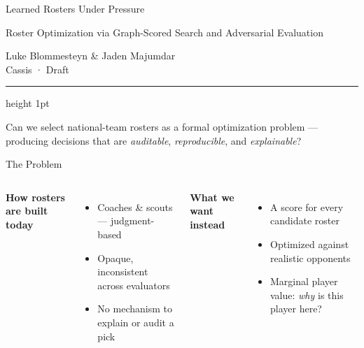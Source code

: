 \documentclass[aspectratio=169,11pt]{beamer}
\begin{document}
\begin{frame}
\vspace{1.8em}
{
Learned Rosters Under Pressure\par}
\vspace{0.3em}
{\color{steel}\small Roster Optimization via Graph-Scored Search and Adversarial Evaluation\par}
\vspace{1.1em}
{\small Luke Blommesteyn \quad \& \quad Jaden Majumdar}\\[0.15em]
{\color{steel}\scriptsize Cassis · Draft}
\vspace{1.3em}
{\color{navy}\hrule height 1pt}
\vspace{0.6em}
{\small Can we select national-team rosters as a formal optimization problem —
producing decisions that are \textit{auditable}, \textit{reproducible}, and \textit{explainable}?}
\end{frame}

\begin{frame}{The Problem}
\begin{columns}[T]
\textbf{How rosters are built today}
\begin{itemize}
  \item Coaches \& scouts — judgment-based
  \item Opaque, inconsistent across evaluators
  \item No mechanism to explain or audit a pick
\end{itemize}
\vspace{0.6em}
\textbf{What we want instead}
\begin{itemize}
  \item A score for every candidate roster
  \item Optimized against realistic opponents
  \item Marginal player value: \emph{why} is this player here?
\end{itemize}

\centering
{}
\end{columns}
\end{frame}
\end{document}
